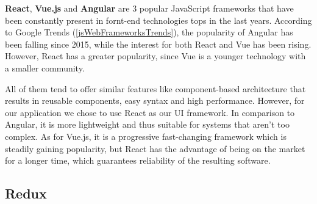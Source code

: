 \textbf{React}, \textbf{Vue.js} and \textbf{Angular} are 3 popular JavaScript frameworks that have been constantly present in fornt-end technologies tops in the last years. According to Google Trends (\ref{jsWebFrameworksTrends}), the popularity of Angular has been falling since 2015, while the interest for both React and Vue has been rising. However, React has a greater popularity, since Vue is a younger technology with a smaller community.


All of them tend to offer similar features like component-based architecture that results in reusable components, easy syntax and high performance. However, for our application we chose to use React as our UI framework. In comparison to Angular, it is more lightweight and thus suitable for systems that aren't too complex. As for Vue.js, it is a progressive fast-changing framework which is steadily gaining popularity, but React has the advantage of being on the market for a longer time, which guarantees reliability of the resulting software.






\subsection{Redux}
\label{section:redux}






\cite{tamingTheStateInReact}


